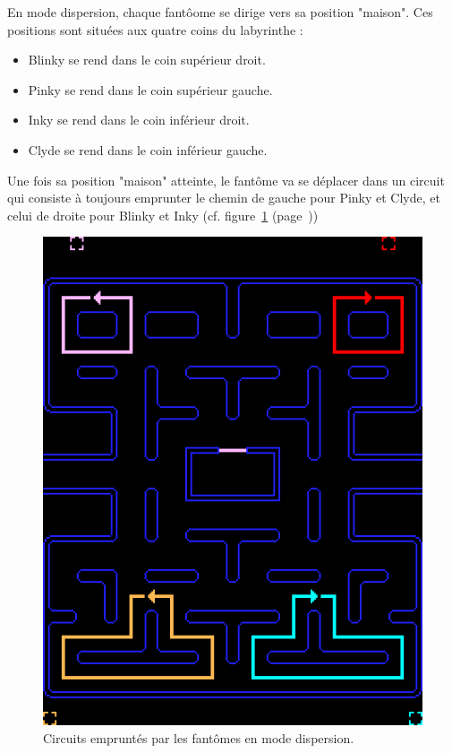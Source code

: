 \documentclass[12pt,a4paper,final]{article}
\newcommand{\labelfigure}[1]{figure~\ref{#1} (page~\pageref{#1})}
\begin{document}
En mode dispersion, chaque fantôome se dirige vers sa position "maison". Ces positions sont situées aux quatre coins du labyrinthe :
\begin{itemize}
\item Blinky se rend dans le coin supérieur droit.
\item Pinky se rend dans le coin supérieur gauche.
\item Inky se rend dans le coin inférieur droit.
\item Clyde se rend dans le coin inférieur gauche.
\end{itemize}
Une fois sa position "maison" atteinte, le fantôme va se déplacer dans un circuit qui consiste à toujours emprunter le chemin de gauche pour Pinky et Clyde, et celui de droite pour Blinky et Inky (cf. \labelfigure{ghostdispersion})
\begin{figure}[!h]
	\centering
	\includegraphics[width=\textwidth]{pacman_ghostmove_dispersion.png}
	\caption{\label{ghostdispersion}Circuits empruntés par les fantômes en mode dispersion.}
\end{figure}
\end{document}
